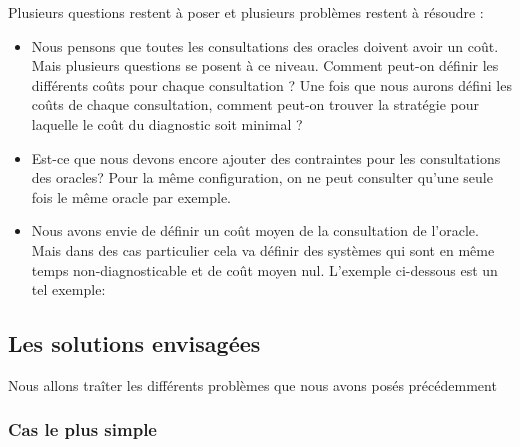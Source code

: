 \documentclass[a4paper,10pt]{article}
\begin{document}
Plusieurs questions restent à poser et plusieurs problèmes restent à résoudre :

\begin{itemize}
\item Nous pensons que toutes les consultations des oracles doivent avoir un co\^ut. Mais plusieurs questions se posent \`a ce niveau. Comment peut-on d\'efinir les diff\'erents co\^uts pour chaque consultation ? Une fois que nous aurons d\'efini les co\^uts de chaque consultation, comment peut-on trouver la strat\'egie pour laquelle le co\^ut du diagnostic soit minimal ?

\item Est-ce que nous devons encore ajouter des contraintes pour les consultations des oracles? Pour la m\^eme configuration, on ne peut consulter qu'une seule fois le m\^eme oracle par exemple.

\item Nous avons envie de d\'efinir un co\^ut moyen de la consultation de l'oracle. Mais dans des cas particulier cela va d\'efinir des syst\`emes qui sont en m\^eme temps non-diagnosticable et de co\^ut moyen nul. L'exemple ci-dessous est un tel exemple:

\begin{figure}[H]
  \begin{center}
  \end{center}
\end{figure}

  
\end{itemize}


\subsection{Les solutions envisag\'ees}

Nous allons tra\^iter les diff\'erents probl\`emes que nous avons pos\'es pr\'ec\'edemment

\subsubsection{Cas le plus simple}
\end{document}
